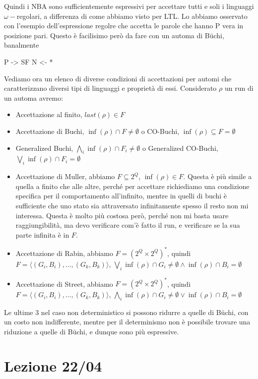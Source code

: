 Quindi i NBA sono sufficientemente espressivi per accettare tutti e soli i linguaggi \(\omega-\)regolari, a differenza di come abbiamo visto per LTL. Lo abbiamo osservato con l'esempio dell'espressione regolre  che accetta le parole che hanno P vera in posizione pari. Questo è facilisimo però da fare con un automa di Büchi, banalmente

P
->
SF  N
<-
*

Vediamo ora un elenco di diverse condizioni di accettazioni per automi che caratterizzano diversi tipi di linguaggi e proprietà di essi. Considerato \(\rho\) un run di un automa avremo:

\begin{itemize}
  \item Accettazione al finito, \(last(\rho) \in F\)
  \item Accettazione di Buchi, \(\inf(\rho) \cap F \neq \emptyset\) o CO-Buchi, \(\inf(\rho) \subseteq F = \emptyset\)
  \item Generalized Buchi, \(\bigwedge_i \inf(\rho) \cap F_i \neq \emptyset\) o Generalized CO-Buchi, \(\bigvee_i \inf(\rho) \cap F_i = \emptyset\)
  \item Accettazione di Muller, abbiamo \(F\subseteq 2^Q\), \(\inf(\rho) \in F\). Questa è più simile a quella a finito che alle altre, perché per accettare richiediamo una condizione specifica per il comportamento all'infinito, mentre in quelli di buchi è sufficiente che uno stato sia attraversato infinitamente spesso il resto non mi interessa. Questa è molto più costosa però, perché non mi basta usare raggiungibilità, ma devo verificare com'è fatto il run, e verificare se la sua parte infinita è in \(F\).
  \item Accettazione di Rabin, abbiamo \(F = {(2^Q\times 2^Q)}^*\), quindi \(F = \langle (G_i,B_i),\ldots,(G_k, B_k)\rangle\), \(\bigvee_i \inf(\rho) \cap G_i \neq \emptyset \land \inf(\rho) \cap B_i = \emptyset\)
  \item Accettazione di Street, abbiamo \(F = {(2^Q\times 2^Q)}^*\), quindi \(F = \langle (G_i,B_i),\ldots,(G_k, B_k)\rangle\), \(\bigwedge_i \inf(\rho) \cap G_i \neq \emptyset \lor \inf(\rho) \cap B_i = \emptyset\)
\end{itemize}

Le ultime 3 nel caso non deterministico si possono ridurre a quelle di Büchi, con un costo non indifferente, mentre per il determinismo non è possibile trovare una riduzione a quelle di Büchi, e dunque sono più espressive.

\chapter{Lezione 22/04}

